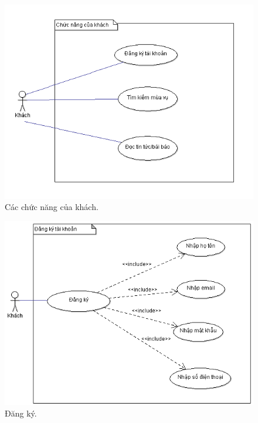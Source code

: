 \documentclass[a4paper,12pt,oneside]{article}
\begin{document}
\begin{figure}[H]
\centering
\includegraphics[scale=.9]{hinh/uc_web1.png}
\caption{Các chức năng của khách.}
\end{figure}

\newpage
\begin{figure}[H]
\centering
\includegraphics[scale=.9]{hinh/reg.png}
\caption{Đăng ký.}
\end{figure}
\end{document}
